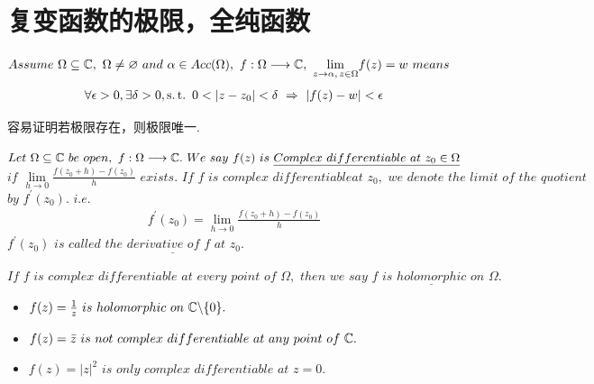 \section{复变函数的极限，全纯函数}
	\begin{defn}\label{def 2.2.1}
		$Assume \,\, \Omega \subseteq \mathbb{C} , \,\, \Omega \neq \varnothing \,\, and \,\, \alpha \in Acc(\Omega) , \,\, f : \Omega \longrightarrow \mathbb{C} , \,\, \underset{z \to \alpha , \, z \in \Omega}{\lim}{f(z)} = w \,\, means$
		\begin{align}
			\forall \epsilon > 0 , \exists \delta > 0 , \operatorname{s.t.} \,\, 0 < \left| z - z_0 \right| < \delta \,\, \Rightarrow \,\, \left| f(z) - w \right| < \epsilon
		\end{align}
	
		\begin{rmk}
			容易证明若极限存在，则极限唯一.
		\end{rmk}
	\end{defn}

	\vspace*{2em}
	\begin{defn}\label{def 2.2.2}
		$Let \,\, \Omega \subseteq \mathbb{C} \,\, be \,\, open , \,\, f : \Omega \longrightarrow \mathbb{C} . \,\, We \,\, say \,\, f(z) \,\, is \,\, \underline{\textbf{$Complex \,\, differentiable \,\, at \,\, z_0 \in \Omega$}}$\\
		$if \,\, \underset{h \to 0}{\lim}{\frac{f(z_0 + h) - f(z_0)}{h}} \,\, exists. \,\, If \,\, f \,\, is \,\, complex \,\, differentiable at \,\, z_0 , \,\, we \,\, denote \,\, the \,\, limit \,\, of \,\, the \,\, quotient $\\ 
		$by \,\, f^{'}(z_0) . \,\, i.e.$
		\begin{align}
			f^{'}(z_0) = \lim_{h \to 0}{\frac{f(z_0 + h) - f(z_0)}{h}}
		\end{align}
		$f^{'}(z_0) \,\, is \,\, called \,\, \underline{\textbf{$the \,\, derivative \,\, of \,\, f \,\, at \,\, z_0$}}$.
		
		\begin{rmk}
			$If \,\, f \,\, is \,\, complex \,\, differentiable \,\, at \,\, every \,\, point \,\, of \,\, \Omega , \,\, then \,\, we \,\, say \,\, f \,\, is \,\, \underline{\textbf{$holomorphic$}} \,\, on \,\,  \Omega.$
		\end{rmk}
	\end{defn}

	\vspace*{2em}
	\begin{example}\label{ex 2.2.1}
		\begin{itemize}
			\item $f(z) = \frac{1}{z} \,\, is \,\, holomorphic \,\, on \,\, \mathbb{C} \backslash \{ 0 \}.$
			
			\item $f(z) = \bar{z} \,\, is \,\, not \,\, complex \,\, differentiable \,\, at \,\, any \,\, point \,\, of \,\, \mathbb{C}.$
			
			\item $f(z) = \left| z \right|^2 \,\, is \,\, only \,\, complex \,\, differentiable \,\, at \,\, z = 0.$
		\end{itemize}
	\end{example}

